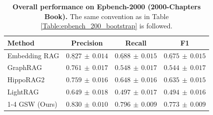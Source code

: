 \begin{table}[t]
\centering
\scriptsize
\setlength{\tabcolsep}{3pt} %
\renewcommand{\arraystretch}{1.05} %
\begin{tabular}{@{}lccc@{}}
\toprule
\textbf{Method} & \textbf{Precision} & \textbf{Recall} & \textbf{F1} \\
\midrule
Embedding RAG
  & $\underline{0.827}\,\pm\,0.014$ & $\underline{0.688}\,\pm\,0.015$ & $\underline{0.675}\,\pm\,0.015$ \\
GraphRAG
  & $0.761\,\pm\,0.017$ & $0.548\,\pm\,0.017$ & $0.544\,\pm\,0.017$ \\
HippoRAG2
  & $0.759\,\pm\,0.016$ & $0.648\,\pm\,0.016$ & $0.635\,\pm\,0.015$ \\
LightRAG
  & $0.649\,\pm\,0.018$ & $0.497\,\pm\,0.017$ & $0.494\,\pm\,0.016$ \\
\cmidrule(lr){1-4}
GSW (Ours) 
  & $\mathbf{0.830}\,\pm\,0.010$ & $\mathbf{0.796}\,\pm\,0.009$ & $\mathbf{0.773}\,\pm\,0.009$ \\
\bottomrule
\end{tabular}
\caption{\textbf{Overall performance on Epbench-2000 (2000-Chapters Book).} The same convention as in Table \ref{Table:epbench_200_bootstrap} is followed.}
\label{tab:epbench_2000_short}
\end{table}
